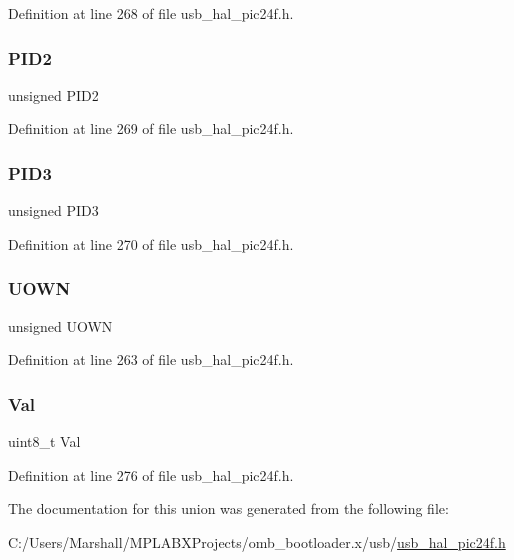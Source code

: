 Definition at line 268 of file usb\+\_\+hal\+\_\+pic24f.\+h.

\mbox{\label{union___b_d___s_t_a_t_aef3d6a9445a3c61d870212360c0a6110}} 
\subsubsection{\texorpdfstring{PID2}{PID2}}
{\footnotesize\ttfamily unsigned P\+I\+D2}



Definition at line 269 of file usb\+\_\+hal\+\_\+pic24f.\+h.

\mbox{\label{union___b_d___s_t_a_t_a771971768126aebea428ac7194b17fc0}} 
\subsubsection{\texorpdfstring{PID3}{PID3}}
{\footnotesize\ttfamily unsigned P\+I\+D3}



Definition at line 270 of file usb\+\_\+hal\+\_\+pic24f.\+h.

\mbox{\label{union___b_d___s_t_a_t_abc982c28d59f8e36dbcb06639010169d}} 
\subsubsection{\texorpdfstring{UOWN}{UOWN}}
{\footnotesize\ttfamily unsigned U\+O\+WN}



Definition at line 263 of file usb\+\_\+hal\+\_\+pic24f.\+h.

\mbox{\label{union___b_d___s_t_a_t_aa0c179f4462bb12ca1ed40d18c89cda1}} 
\subsubsection{\texorpdfstring{Val}{Val}}
{\footnotesize\ttfamily uint8\+\_\+t Val}



Definition at line 276 of file usb\+\_\+hal\+\_\+pic24f.\+h.



The documentation for this union was generated from the following file\+:\begin{DoxyCompactItemize}
\item 
C\+:/\+Users/\+Marshall/\+M\+P\+L\+A\+B\+X\+Projects/omb\+\_\+bootloader.\+x/usb/\mbox{\hyperlink{usb__hal__pic24f_8h}{usb\+\_\+hal\+\_\+pic24f.\+h}}\end{DoxyCompactItemize}
